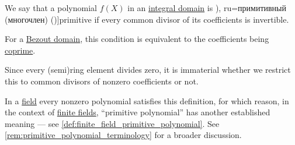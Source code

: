 \begin{definition}\label{def:domain_primitive_polynomial}
  We say that a polynomial \( f(X) \) in an \hyperref[def:integral_domain]{integral domain} is \term[bg=примитивен (полином) (\cite[43]{ГеновМиховскиМоллов1991Алгебра}), ru=примитивный (многочлен) (\cite[124]{Винберг2014КурсАлгебры})]{primitive} if every common divisor of its coefficients is invertible.
\end{definition}
\begin{comments}
  \item For a \hyperref[def:bezout_domain]{Bezout domain}, this condition is equivalent to the coefficients being \hyperref[def:coprime_elements]{coprime}.

  \item Since every (semi)ring element divides zero, it is immaterial whether we restrict this to common divisors of nonzero coefficients or not.

  \item In a \hyperref[def:field]{field} every nonzero polynomial satisfies this definition, for which reason, in the context of \hyperref[def:finite_field]{finite fields}, \enquote{primitive polynomial} has another established meaning --- see \cref{def:finite_field_primitive_polynomial}. See \cref{rem:primitive_polynomial_terminology} for a broader discussion.
\end{comments}

